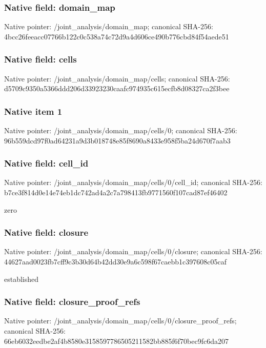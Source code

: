 \documentclass[10pt,a4paper]{article}
\begin{document}
\subsubsection{Native field: domain\_\allowbreak{}map}
Native pointer: /joint\_\allowbreak{}analysis/domain\_\allowbreak{}map; canonical SHA-256: 4bcc26feeacc07766b122c0c538a74c72d9a4d606ce490b776cbd84f54aede51

\subsubsection{Native field: cells}
Native pointer: /joint\_\allowbreak{}analysis/domain\_\allowbreak{}map/cells; canonical SHA-256: d5709c9350a5366ddd206d33923230caafc974935c615ecfb8d08327ca2f3bee

\subsubsection{Native item 1}
Native pointer: /joint\_\allowbreak{}analysis/domain\_\allowbreak{}map/cells/0; canonical SHA-256: 96b559dcd97f0ad64231a9d3b018748e85f8690a8433e958f5ba24d670f7aab3

\subsubsection{Native field: cell\_\allowbreak{}id}
Native pointer: /joint\_\allowbreak{}analysis/domain\_\allowbreak{}map/cells/0/cell\_\allowbreak{}id; canonical SHA-256: b7ce3f814d0e14e74eb1dc742ad4a2c7a798413fb9771560f107cad87ef46402

\begingroup\raggedright\sloppy zero\par\endgroup

\subsubsection{Native field: closure}
Native pointer: /joint\_\allowbreak{}analysis/domain\_\allowbreak{}map/cells/0/closure; canonical SHA-256: 44627aad0023fb7cff9c3b30d64b42dd30e9a6c598f67caebb1c397608c05caf

\begingroup\raggedright\sloppy established\par\endgroup

\subsubsection{Native field: closure\_\allowbreak{}proof\_\allowbreak{}refs}
Native pointer: /joint\_\allowbreak{}analysis/domain\_\allowbreak{}map/cells/0/closure\_\allowbreak{}proof\_\allowbreak{}refs; canonical SHA-256: 66eb6032eedbe2af4b8580e3158597786505211582bb885f6f70bec9fc6da207
\end{document}
